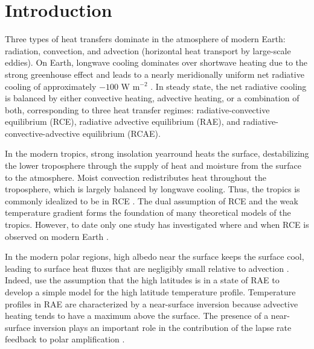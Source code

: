 \documentclass{ametsocV5}
\begin{document}



\section{Introduction}
    Three types of heat transfers dominate in the atmosphere of modern Earth: radiation, convection, and advection (horizontal heat transport by large-scale eddies). On Earth, longwave cooling dominates over shortwave heating due to the strong greenhouse effect and leads to a nearly meridionally uniform net radiative cooling of approximately $-100$ W m$^{-2}$ \citep{lin2008}. In steady state, the net radiative cooling is balanced by either convective heating, advective heating, or a combination of both, corresponding to three heat transfer regimes: radiative-convective equilibrium (RCE), radiative advective equilibrium (RAE), and radiative-convective-advective equilibrium (RCAE).
    
    In the modern tropics, strong insolation yearround heats the surface, destabilizing the lower troposphere through the supply of heat and moisture from the surface to the atmosphere. Moist convection redistributes heat throughout the troposphere, which is largely balanced by longwave cooling. Thus, the tropics is commonly idealized to be in RCE \citep{wing2018}. The dual assumption of RCE and the weak temperature gradient \citep{bretherton2002} forms the foundation of many theoretical models of the tropics. However, to date only one study has investigated where and when RCE is observed on modern Earth \citep{jakob2019}.
    
    In the modern polar regions, high albedo near the surface keeps the surface cool, leading to surface heat fluxes that are negligibly small relative to advection \citep{nakamura1988}. Indeed, \cite{cronin2016} use the assumption that the high latitudes is in a state of RAE to develop a simple model for the high latitude temperature profile. Temperature profiles in RAE are characterized by a near-surface inversion because advective heating tends to have a maximum above the surface. The presence of a near-surface inversion plays an important role in the contribution of the lapse rate feedback to polar amplification \cite{pithan2014,payne2015}.
    
\end{document}
